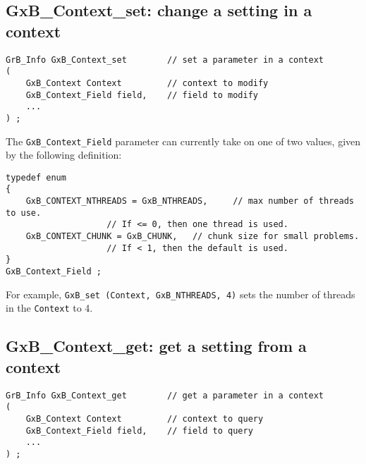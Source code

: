 \documentclass[12pt]{article}
\begin{document}
\newpage
\subsection{{\sf GxB\_Context\_set:}  change a setting in a context}
\label{context_set}

\begin{mdframed}[userdefinedwidth=6in]
{\footnotesize
\begin{verbatim}
GrB_Info GxB_Context_set        // set a parameter in a context
(
    GxB_Context Context         // context to modify
    GxB_Context_Field field,    // field to modify
    ...
) ;
\end{verbatim} } \end{mdframed}

The \verb'GxB_Context_Field' parameter can currently take on one of two
values, given by the following definition:

{\footnotesize
\begin{verbatim}
typedef enum
{
    GxB_CONTEXT_NTHREADS = GxB_NTHREADS,     // max number of threads to use.
                    // If <= 0, then one thread is used.
    GxB_CONTEXT_CHUNK = GxB_CHUNK,   // chunk size for small problems.
                    // If < 1, then the default is used.
}
GxB_Context_Field ;
\end{verbatim}
}

For example, \verb'GxB_set (Context, GxB_NTHREADS, 4)' sets the number of
threads in the \verb'Context' to 4.

\subsection{{\sf GxB\_Context\_get:}  get a setting from a context}
\label{context_get}

\begin{mdframed}[userdefinedwidth=6in]
{\footnotesize
\begin{verbatim}
GrB_Info GxB_Context_get        // get a parameter in a context
(
    GxB_Context Context         // context to query
    GxB_Context_Field field,    // field to query
    ...
) ;
\end{verbatim} } \end{mdframed}
\end{document}
